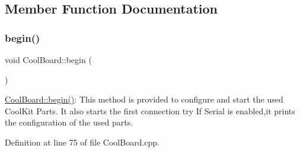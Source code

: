 \subsection{Member Function Documentation}
\mbox{\label{class_cool_board_acba7c5aef7268b2c0044bdb54d3b9d76}} 
\subsubsection{\texorpdfstring{begin()}{begin()}}
{\footnotesize\ttfamily void Cool\+Board\+::begin (\begin{DoxyParamCaption}{ }\end{DoxyParamCaption})}

\hyperlink{class_cool_board_acba7c5aef7268b2c0044bdb54d3b9d76}{Cool\+Board\+::begin()}\+: This method is provided to configure and start the used Cool\+Kit Parts. It also starts the first connection try If Serial is enabled,it prints the configuration of the used parts. 

Definition at line 75 of file Cool\+Board.\+cpp.


